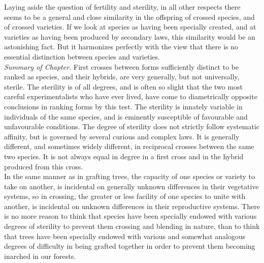 \indent Laying aside the question of fertility and sterility, in all other respects there seems to be a general and close similarity in the offspring of crossed species, and of crossed varieties. If we look at species as having been specially created, and at varieties as having been produced by secondary laws, this similarity would be an astonishing fact. But it harmonizes perfectly with the view that there is no essential distinction between species and varieties.\\
\indent \emph{Summary of Chapter.} First crosses between forms sufficiently distinct to be ranked as species, and their hybrids, are very generally, but not universally, sterile. The sterility is of all degrees, and is often so slight that the two most careful experimentalists who have ever lived, have come to diametrically opposite conclusions in ranking forms by this test. The sterility is innately variable in individuals of the same species, and is eminently susceptible of favourable and unfavourable conditions. The degree of sterility does not strictly follow systematic affinity, but is governed by several curious and complex laws. It is generally different, and sometimes widely different, in reciprocal crosses between the same two species. It is not always equal in degree in a first cross and in the hybrid produced from this cross.\\
\indent In the same manner as in grafting trees, the capacity of one species or variety to take on another, is incidental on generally unknown differences in their vegetative systems, so in crossing, the greater or less facility of one species to unite with another, is incidental on unknown differences in their reproductive systems. There is no more reason to think that species have been specially endowed with various degrees of sterility to prevent them crossing and blending in nature, than to think that trees have been specially endowed with various and somewhat analogous degrees of difficulty in being grafted together in order to prevent them becoming inarched in our forests.\\
